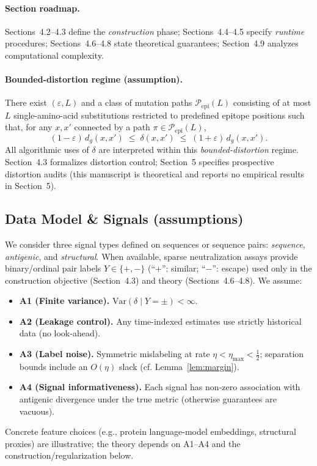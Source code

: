 \documentclass[11pt]{article}
\begin{document}
\paragraph{Section roadmap.}
Sections~4.2--4.3 define the \emph{construction} phase; Sections~4.4--4.5 specify \emph{runtime} procedures; Sections~4.6--4.8 state theoretical guarantees; Section~4.9 analyzes computational complexity.

\paragraph{Bounded-distortion regime (assumption).}
There exist $(\varepsilon,L)$ and a class of mutation paths $\mathcal{P}_{\mathrm{epi}}(L)$ consisting of at most $L$ single-amino-acid substitutions restricted to predefined epitope positions such that, for any $x,x'$ connected by a path $\pi\in\mathcal{P}_{\mathrm{epi}}(L)$,
\begin{equation}
(1-\varepsilon)\,d_g(x,x') \;\le\; \delta(x,x') \;\le\; (1+\varepsilon)\,d_g(x,x') .
\end{equation}
All algorithmic uses of $\delta$ are interpreted within this \emph{bounded-distortion} regime. Section~4.3 formalizes distortion control; Section~5 specifies prospective distortion audits (this manuscript is theoretical and reports no empirical results in Section~5).

\subsection{Data Model \& Signals (assumptions)}
We consider three signal types defined on sequences or sequence pairs: \emph{sequence}, \emph{antigenic}, and \emph{structural}. When available, sparse neutralization assays provide binary/ordinal pair labels $Y\in\{+,-\}$ (``$+$'': similar; ``$-$'': escape) used only in the construction objective (Section~4.3) and theory (Sections~4.6--4.8). We assume:
\begin{itemize}
\item \textbf{A1 (Finite variance).} $\mathrm{Var}(\delta\mid Y=\pm)<\infty$.
\item \textbf{A2 (Leakage control).} Any time-indexed estimates use strictly historical data (no look‑ahead).
\item \textbf{A3 (Label noise).} Symmetric mislabeling at rate $\eta<\eta_{\max}<\tfrac{1}{2}$; separation bounds include an $O(\eta)$ slack (cf. Lemma~\ref{lem:margin}).
\item \textbf{A4 (Signal informativeness).} Each signal has non‑zero association with antigenic divergence under the true metric (otherwise guarantees are vacuous).
\end{itemize}
Concrete feature choices (e.g., protein language-model embeddings, structural proxies) are illustrative; the theory depends on A1–A4 and the construction/regularization below.
\end{document}
